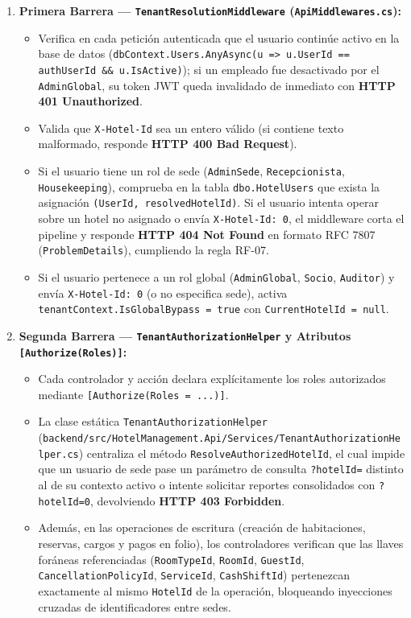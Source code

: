 \documentclass[12pt,a4paper]{article}
\begin{document}
\begin{enumerate}
    \item \textbf{Primera Barrera --- \texttt{TenantResolutionMiddleware} (\texttt{ApiMiddlewares.cs}):}
    \begin{itemize}
        \item Verifica en cada petici\'on autenticada que el usuario contin\'ue activo en la base de datos (\texttt{dbContext.Users.AnyAsync(u => u.UserId == authUserId \&\& u.IsActive)}); si un empleado fue desactivado por el \texttt{AdminGlobal}, su token JWT queda invalidado de inmediato con \textbf{HTTP 401 Unauthorized}.
        \item Valida que \texttt{X-Hotel-Id} sea un entero v\'alido (si contiene texto malformado, responde \textbf{HTTP 400 Bad Request}).
        \item Si el usuario tiene un rol de sede (\texttt{AdminSede}, \texttt{Recepcionista}, \texttt{Housekeeping}), comprueba en la tabla \texttt{dbo.HotelUsers} que exista la asignaci\'on \texttt{(UserId, resolvedHotelId)}. Si el usuario intenta operar sobre un hotel no asignado o env\'ia \texttt{X-Hotel-Id: 0}, el middleware corta el pipeline y responde \textbf{HTTP 404 Not Found} en formato RFC 7807 (\texttt{ProblemDetails}), cumpliendo la regla RF-07.
        \item Si el usuario pertenece a un rol global (\texttt{AdminGlobal}, \texttt{Socio}, \texttt{Auditor}) y env\'ia \texttt{X-Hotel-Id: 0} (o no especifica sede), activa \texttt{tenantContext.IsGlobalBypass = true} con \texttt{CurrentHotelId = null}.
    \end{itemize}

    \item \textbf{Segunda Barrera --- \texttt{TenantAuthorizationHelper} y Atributos \texttt{[Authorize(Roles)]}:}
    \begin{itemize}
        \item Cada controlador y acci\'on declara expl\'icitamente los roles autorizados mediante \texttt{[Authorize(Roles = ...)]}.
        \item La clase est\'atica \texttt{TenantAuthorizationHelper} (\texttt{backend/src/HotelManagement.Api/Services/TenantAuthorizationHelper.cs}) centraliza el m\'etodo \texttt{ResolveAuthorizedHotelId}, el cual impide que un usuario de sede pase un par\'ametro de consulta \texttt{?hotelId=} distinto al de su contexto activo o intente solicitar reportes consolidados con \texttt{?hotelId=0}, devolviendo \textbf{HTTP 403 Forbidden}.
        \item Adem\'as, en las operaciones de escritura (creaci\'on de habitaciones, reservas, cargos y pagos en folio), los controladores verifican que las llaves for\'aneas referenciadas (\texttt{RoomTypeId}, \texttt{RoomId}, \texttt{GuestId}, \texttt{CancellationPolicyId}, \texttt{ServiceId}, \texttt{CashShiftId}) pertenezcan exactamente al mismo \texttt{HotelId} de la operaci\'on, bloqueando inyecciones cruzadas de identificadores entre sedes.
    \end{itemize}


\end{enumerate}
\end{document}
